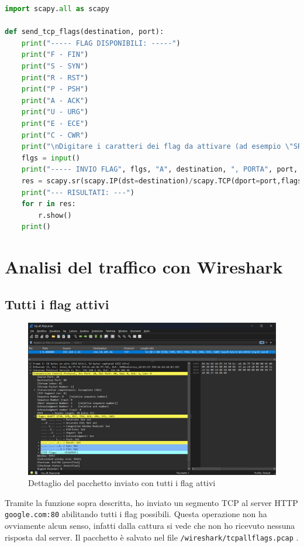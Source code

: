 \documentclass[12pt,a4paper]{report}
\begin{document}
\begin{lstlisting}[language=Python, caption={Funzione python per la generazione di un segmento \texttt{TCP} con flag attivabili a scelta}, label={code:tcp_flags}]
import scapy.all as scapy

def send_tcp_flags(destination, port):
    print("----- FLAG DISPONIBILI: -----")
    print("F - FIN")
    print("S - SYN")
    print("R - RST")
    print("P - PSH")
    print("A - ACK")
    print("U - URG")
    print("E - ECE")
    print("C - CWR")
    print("\nDigitare i caratteri dei flag da attivare (ad esempio \"SR\" per i flag SYN e RST)\n>", end=" ")
    flgs = input()
    print("----- INVIO FLAG", flgs, "A", destination, ", PORTA", port, "-----")
    res = scapy.sr(scapy.IP(dst=destination)/scapy.TCP(dport=port,flags=flgs), timeout=4)
    print("--- RISULTATI: ---")
    for r in res:
        r.show()
    print()
\end{lstlisting}

\section{Analisi del traffico con Wireshark}

\subsection{Tutti i flag attivi}
\begin{figure}[H]
	\centering
	\includegraphics[width=1\textwidth]{tcp_all_flags}
 	\caption{Dettaglio del pacchetto inviato con tutti i flag attivi}
	\label{tcp_all_flags}
\end{figure}
Tramite la funzione sopra descritta, ho inviato un segmento TCP al server HTTP \texttt{google.com:80} abilitando tutti i flag possibili.
Questa operazione non ha ovviamente alcun senso, infatti dalla cattura si vede che non ho ricevuto nessuna risposta dal server. 
Il pacchetto è salvato nel file \texttt{/wireshark/tcp{\textunderscore}all{\textunderscore}flags.pcap} .
\end{document}
